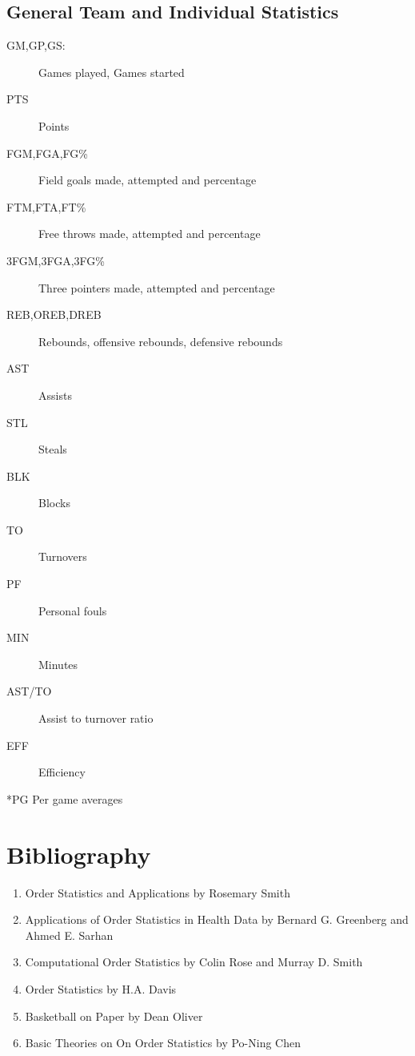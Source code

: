 \documentclass[11pt,a4paper]{article}
\theoremstyle{plain}
\begin{document}
\subsection*{General Team and Individual Statistics}
\begin{description}
  \item[GM,GP,GS:]Games played, Games started
  \item[PTS] Points
  \item[FGM,FGA,FG\%] Field goals made, attempted and percentage
  \item[FTM,FTA,FT\%]Free throws made, attempted and percentage
  \item[3FGM,3FGA,3FG\%]Three pointers made, attempted and percentage
  \item[REB,OREB,DREB] Rebounds, offensive rebounds, defensive rebounds
  \item[AST]Assists
  \item[STL]Steals
  \item[BLK]Blocks
  \item[TO]Turnovers
  \item[PF]Personal fouls
  \item[MIN] Minutes
  \item[AST/TO] Assist to turnover ratio
  \item[EFF] Efficiency 
\end{description}
 *PG Per game averages


\newpage
\section*{Bibliography}
\begin{enumerate}
\item Order Statistics and Applications by Rosemary Smith
\item{Applications of Order Statistics in Health Data by Bernard G. Greenberg and Ahmed E. Sarhan}
\item Computational Order Statistics by Colin Rose and Murray D. Smith
\item Order Statistics by H.A. Davis 
\item Basketball on Paper by Dean Oliver
\item Basic Theories on On Order Statistics by Po-Ning Chen 
\end{enumerate}
\end{document}
